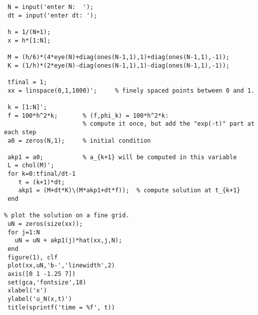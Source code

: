 {\footnotesize \begin{verbatim}
 N = input('enter N:  ');
 dt = input('enter dt: ');

 h = 1/(N+1);
 x = h*[1:N];

 M = (h/6)*(4*eye(N)+diag(ones(N-1,1),1)+diag(ones(N-1,1),-1));
 K = (1/h)*(2*eye(N)-diag(ones(N-1,1),1)-diag(ones(N-1,1),-1));

 tfinal = 1;
 xx = linspace(0,1,1000)';     % finely spaced points between 0 and 1.

 k = [1:N]';
 f = 100*h^2*k;       % (f,phi_k) = 100*h^2*k:  
                      % compute it once, but add the "exp(-t)" part at each step
 a0 = zeros(N,1);     % initial condition

 akp1 = a0;           % a_{k+1} will be computed in this variable
 L = chol(M)';
 for k=0:tfinal/dt-1
    t = (k+1)*dt;
    akp1 = (M+dt*K)\(M*akp1+dt*f));  % compute solution at t_{k+1}
 end

% plot the solution on a fine grid.
 uN = zeros(size(xx));
 for j=1:N
   uN = uN + akp1(j)*hat(xx,j,N);
 end
 figure(1), clf 
 plot(xx,uN,'b-','linewidth',2)
 axis([0 1 -1.25 7])
 set(gca,'fontsize',18)
 xlabel('x')
 ylabel('u_N(x,t)')
 title(sprintf('time = %f', t))
\end{verbatim}}
